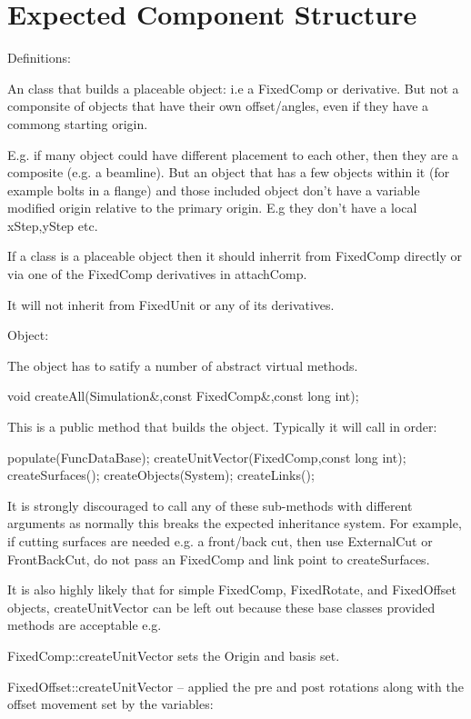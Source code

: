 \section{Expected Component Structure}
\label{Sec:Structure}

Definitions:

   An class that builds a placeable object: i.e a FixedComp or
   derivative. But not a componsite of objects that have their own
   offset/angles, even if they have a commong starting origin.

     E.g. if many object could have different placement to each other,
     then they are a composite (e.g. a beamline). But an object that
     has a few objects within it (for example bolts in a flange) and
     those included object don't have a variable modified origin relative
     to the primary origin. E.g they don't have a local xStep,yStep etc.


     If a class is a placeable object then it should inherrit from
     FixedComp directly or via one of the FixedComp derivatives in
     attachComp.

     It will not inherit from FixedUnit or any of its derivatives.



 Object:

   The object has to satify a number of abstract virtual methods.

     void createAll(Simulation&,const FixedComp&,const long int);

     This is a public method that builds the object. Typically it will call in order:

     populate(FuncDataBase);
     createUnitVector(FixedComp,const long int);
     createSurfaces();
     createObjects(System);
     createLinks();


     It is strongly discouraged to call any of these sub-methods with
     different arguments as normally this breaks the expected
     inheritance system. For example, if cutting surfaces are needed
     e.g. a front/back cut, then use ExternalCut or FrontBackCut, do
     not pass an FixedComp and link point to createSurfaces.


     It is also highly likely that for simple FixedComp, FixedRotate,
     and FixedOffset  objects, createUnitVector can be
     left out because these base classes provided methods
     are acceptable e.g.

     FixedComp::createUnitVector sets the Origin and basis set.

     FixedOffset::createUnitVector -- applied the pre and post rotations
     along with the offset movement set by the variables:

